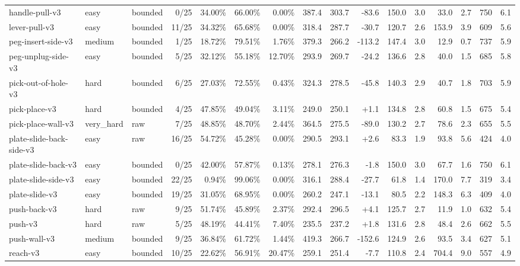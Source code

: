 \begin{landscape}
\begin{longtable}{@{}l l l r r r r r r r r r r r r r@{}}
handle-pull-v3 & easy & bounded & 0/25 & 34.00\% & 66.00\% & 0.00\% & 387.4 & 303.7 & -83.6 & 150.0 & 3.0 & 33.0 & 2.7 & 750 & 6.1 \\
lever-pull-v3 & easy & bounded & 11/25 & 34.32\% & 65.68\% & 0.00\% & 318.4 & 287.7 & -30.7 & 120.7 & 2.6 & 153.9 & 3.9 & 609 & 5.6 \\
peg-insert-side-v3 & medium & bounded & 1/25 & 18.72\% & 79.51\% & 1.76\% & 379.3 & 266.2 & -113.2 & 147.4 & 3.0 & 12.9 & 0.7 & 737 & 5.9 \\
peg-unplug-side-v3 & easy & bounded & 5/25 & 32.12\% & 55.18\% & 12.70\% & 293.9 & 269.7 & -24.2 & 136.6 & 2.8 & 40.0 & 1.5 & 685 & 5.8 \\
pick-out-of-hole-v3 & hard & bounded & 6/25 & 27.03\% & 72.55\% & 0.43\% & 324.3 & 278.5 & -45.8 & 140.3 & 2.9 & 40.7 & 1.8 & 703 & 5.9 \\
pick-place-v3 & hard & bounded & 4/25 & 47.85\% & 49.04\% & 3.11\% & 249.0 & 250.1 & +1.1 & 134.8 & 2.8 & 60.8 & 1.5 & 675 & 5.4 \\
pick-place-wall-v3 & very\_hard & raw & 7/25 & 48.85\% & 48.70\% & 2.44\% & 364.5 & 275.5 & -89.0 & 130.2 & 2.7 & 78.6 & 2.3 & 655 & 5.5 \\
plate-slide-back-side-v3 & easy & raw & 16/25 & 54.72\% & 45.28\% & 0.00\% & 290.5 & 293.1 & +2.6 & 83.3 & 1.9 & 93.8 & 5.6 & 424 & 4.0 \\
plate-slide-back-v3 & easy & bounded & 0/25 & 42.00\% & 57.87\% & 0.13\% & 278.1 & 276.3 & -1.8 & 150.0 & 3.0 & 67.7 & 1.6 & 750 & 6.1 \\
plate-slide-side-v3 & easy & bounded & 22/25 & 0.94\% & 99.06\% & 0.00\% & 316.1 & 288.4 & -27.7 & 61.8 & 1.4 & 170.0 & 7.7 & 319 & 3.4 \\
plate-slide-v3 & easy & bounded & 19/25 & 31.05\% & 68.95\% & 0.00\% & 260.2 & 247.1 & -13.1 & 80.5 & 2.2 & 148.3 & 6.3 & 409 & 4.0 \\
push-back-v3 & hard & raw & 9/25 & 51.74\% & 45.89\% & 2.37\% & 292.4 & 296.5 & +4.1 & 125.7 & 2.7 & 11.9 & 1.0 & 632 & 5.4 \\
push-v3 & hard & raw & 5/25 & 48.19\% & 44.41\% & 7.40\% & 235.5 & 237.2 & +1.8 & 131.6 & 2.8 & 48.4 & 2.6 & 662 & 5.5 \\
push-wall-v3 & medium & bounded & 9/25 & 36.84\% & 61.72\% & 1.44\% & 419.3 & 266.7 & -152.6 & 124.9 & 2.6 & 93.5 & 3.4 & 627 & 5.1 \\
reach-v3 & easy & bounded & 10/25 & 22.62\% & 56.91\% & 20.47\% & 259.1 & 251.4 & -7.7 & 110.8 & 2.4 & 704.4 & 9.0 & 557 & 4.9 \\

\end{longtable}
\end{landscape}
